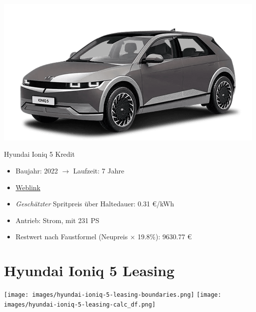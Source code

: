 \documentclass[landscape, DIV=99, 14pt]{scrartcl}
\begin{document}
\pagebreak
\null
\vspace{2cm}
\begin{center}
\includegraphics[width=0.9\columnwidth]{cars/hyundai-ioniq-5.png}

Hyundai Ioniq 5 Kredit
\end{center}

\begin{itemize}
    \item Baujahr: 2022 $\rightarrow$ Laufzeit: 7 Jahre
    \item \href{https://konfigurator.meinauto.de/hyundai/neuwagen/ioniq/angebote/ioniq-5/konfigurator/\#!/extras/-/8865700/14,19,41/private/104690-6897-293274/4864/61e90b0c48e55/cash-purchase/104690-6897-293274/24,9000,15000,0,0,0,0,0,}{Weblink}
    \item \emph{Gesch\"atzter} Spritpreis \"uber Haltedauer: 0.31 \euro{}/kWh
    \item Antrieb: Strom, mit 231 PS
    \item Restwert nach Faustformel (Neupreis $\times$ 19.8\%): 9630.77 \euro{}
\end{itemize}

\pagebreak


\twocolumn

\section*{Hyundai Ioniq 5 Leasing}
\begin{center}
\texttt{[image: images/hyundai-ioniq-5-leasing-boundaries.png]}
\null
\vspace{0.5cm}
\texttt{[image: images/hyundai-ioniq-5-leasing-calc\_df.png]}
\end{center}
\end{document}
